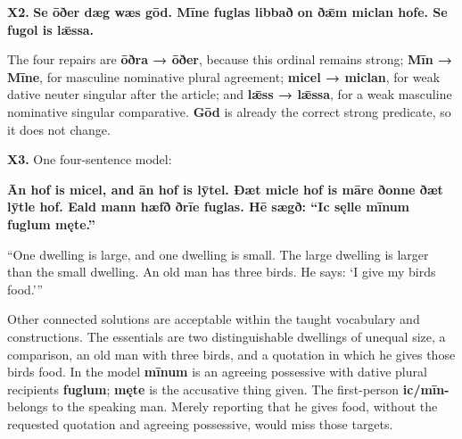 \par\begin{minipage}{\linewidth}\raggedright
\textbf{X2.} \textbf{Se ōðer dæg wæs gōd. Mīne fuglas libbað on ðǣm miclan hofe. Se fugol is lǣssa.}

The four repairs are \textbf{ōðra → ōðer}, because this ordinal remains strong; \textbf{Mīn → Mīne}, for masculine nominative plural agreement; \textbf{micel → miclan}, for weak dative neuter singular after the article; and \textbf{lǣss → lǣssa}, for a weak masculine nominative singular comparative. \textbf{Gōd} is already the correct strong predicate, so it does not change.

\end{minipage}\par\addvspace{4pt}

\par\begin{minipage}{\linewidth}\raggedright
\textbf{X3.} One four-sentence model:

\textbf{Ān hof is micel, and ān hof is lȳtel. Ðæt micle hof is māre ðonne ðæt lȳtle hof. Eald mann hæfð ðrīe fuglas. Hē sægð: “Ic sęlle mīnum fuglum męte.”}

“One dwelling is large, and one dwelling is small. The large dwelling is larger than the small dwelling. An old man has three birds. He says: ‘I give my birds food.’”

Other connected solutions are acceptable within the taught vocabulary and constructions. The essentials are two distinguishable dwellings of unequal size, a comparison, an old man with three birds, and a quotation in which he gives those birds food. In the model \textbf{mīnum} is an agreeing possessive with dative plural recipients \textbf{fuglum}; \textbf{męte} is the accusative thing given. The first-person \textbf{ic/\allowbreak{}mīn-} belongs to the speaking man. Merely reporting that he gives food, without the requested quotation and agreeing possessive, would miss those targets.

\end{minipage}\par\addvspace{4pt}

